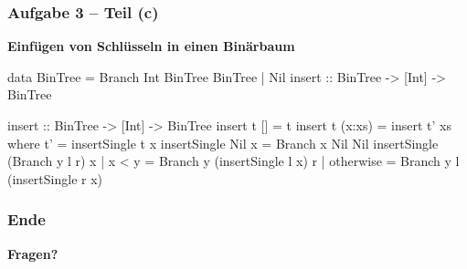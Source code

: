 \documentclass{beamer}
\begin{document}
\begin{frame}[t, fragile] \frametitle{Aufgabe 3 -- Teil (c)}
	\textbf{Einfügen von Schlüsseln in einen Binärbaum}
	
	\begin{codebox}
data BinTree = Branch Int BinTree BinTree | Nil 
insert :: BinTree -> [Int] -> BinTree
	\end{codebox}
	
	\bigskip \pause
	
	\begin{codebox}
insert :: BinTree -> [Int] -> BinTree
insert t     [] = t
insert t (x:xs) = insert t' xs
    where t' = insertSingle t x
        insertSingle Nil            x = Branch x Nil Nil
        insertSingle (Branch y l r) x
            | x < y     = Branch y (insertSingle l x) r
            | otherwise = Branch y l (insertSingle r x)
	\end{codebox}
\end{frame}



\begin{frame} \frametitle{Ende}
	\centering
	\textbf{Fragen?}
\end{frame}
\end{document}
